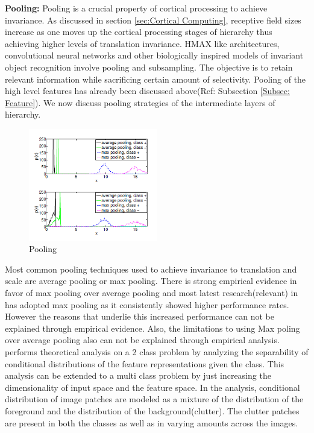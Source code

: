 \documentclass[12pt,twoside]{article}
\theoremstyle{plain}
\theoremstyle{definition}
\theoremstyle{remark}
\begin{document}
\textbf{Pooling: }
Pooling is a crucial property of cortical processing to achieve invariance. As discussed in section \ref{sec:Cortical Computing}, receptive field sizes increase as one moves up the cortical processing stages of hierarchy thus achieving higher levels of translation invariance. HMAX like architectures, convolutional neural networks and other biologically inspired models of invariant object recognition involve pooling and subsampling. The objective is to retain relevant information while sacrificing certain amount of selectivity. Pooling of the high level features has already been discussed above(Ref: Subsection \ref{Subsec: Feature}). We now discuss pooling strategies of the intermediate layers of hierarchy.
\begin{figure} 
	\begin{centering}
		\includegraphics[width=0.5\textwidth]{pooling}
		\caption{Pooling}
	\end{centering}
  \label{fig:pooling}
\end{figure}
Most common pooling techniques used to achieve invariance to translation and scale are average pooling or max pooling. There is strong empirical evidence in favor of max pooling over average pooling\cite{Y-LanBoureau2010} and most latest research(relevant) in has adopted max pooling as it consistently showed higher performance rates. However the reasons that underlie this increased performance can not be explained through empirical evidence. Also, the limitations to using Max poling over average pooling also can not be explained through empirical analysis. \cite{Y-LanBoureau2010a} performs theoretical analysis on a 2 class problem by analyzing the separability of conditional distributions of the feature representations given the class. This analysis can be extended to a multi class problem by just increasing the dimensionality of input space and the feature space. In the analysis, conditional distribution of image patches are modeled as a mixture of the distribution of the foreground and the distribution of the background(clutter). The clutter patches are present in both the classes as well as in varying amounts across the images.
\end{document}

